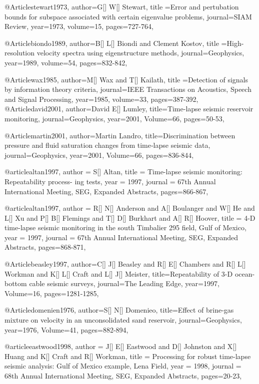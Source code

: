 @Article{stewart1973,
  author={G[] W[] Stewart},
  title ={Error and pertubation bounds for subspace associated with certain eigenvalue problems},
  journal={SIAM Review},
  year=1973,
  volume=15,
  pages={727-764},
}

@Article{biondo1989,
  author={B[] L[] Biondi and Clement Kostov},
  title ={High-resolution velocity spectra using eigenstructure methods},
  journal={Geophysics},
  year=1989,
  volume=54,
  pages={832-842},
}

@Article{wax1985,
  author={M[] Wax and T[] Kailath},
  title ={Detection of signals by information theory criteria},
  journal={IEEE Transactions on Acoustics, Speech and Signal Processing},
  year=1985,
  volume=33,
  pages={387-392},
}
@Article{david2001,
  author={David E[] Lumley},
  title={Time-lapse seismic reservoir monitoring},
  journal={Geophysics},
  year=2001,
  Volume=66,
  pages={50-53},
}

@Article{martin2001,
  author={Martin Landro},
  title={Discrimination between pressure and fluid saturation changes from time‐lapse seismic data},
  journal={Geophysics},
  year=2001,
  Volume=66,
  pages={836-844},
}

@article{altan1997,
  author =	 {S[] Altan},
  title =	 {Time-lapse seismic monitoring: Repeatability process-
ing tests},
  year =	 1997,
  journal =	 {67th Annual International Meeting, SEG, Expanded Abstracts},
 pages=866-867,
}

@article{altan1997,
  author =	 {R[] N[] Anderson and A[] Boulanger and W[] He and L[] Xu and P[] B[] Flemings and T[] D[] Burkhart and A[] R[] Hoover},
  title =	 {4-D time-lapse seismic
monitoring in the south Timbalier 295 field, Gulf of Mexico},
  year =	 1997,
  journal =	 {67th Annual International Meeting, SEG, Expanded Abstracts},
 pages=868-871,
}

@Article{beasley1997,
  author={C[] J[] Beasley and R[] E[] Chambers and R[] L[] Workman and K[] L[] Craft and L[] J[] Meister},
  title={Repeatability of 3-D ocean-bottom cable seismic
surveys},
  journal={The Leading Edge},
  year=1997,
  Volume=16,
  pages={1281-1285},
}


@Article{domenien1976,
  author={S[] N[] Domenieo},
  title={Effect of brine-gas mixture on velocity in an
unconsolidated sand reservoir},
  journal={Geophysics},
  year=1976,
  Volume=41,
  pages={882-894},
}

@article{eastwood1998,
  author =	 {J[] E[] Eastwood and D[] Johnston and X[] Huang and K[] Craft and R[] Workman},
  title =	 { Processing for robust time-lapse seismic analysis: Gulf of
Mexico example, Lena Field},
  year =	 1998,
  journal =	 {68th Annual International Meeting, SEG, Expanded Abstracts},
 pages=20-23,
}


